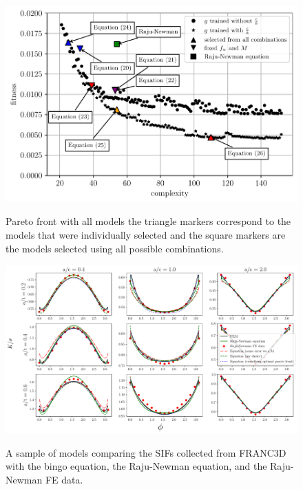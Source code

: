 \begin{figure}
    \centering
    \includegraphics[width=\textwidth]{Figures_pdf/Pareto_fronts_everything.pdf}
    \label{fig:perato_front_everythin}
    \caption{Pareto front with all models the triangle markers correspond to the models that were individually selected and the square markers are the models selected using all possible combinations.}
\end{figure}

\begin{figure}
    \centering
    \includegraphics[width=\textwidth]{Figures_pdf/K_data_with_bingo.pdf}
    \label{fig:K_data_with_bingo}
    \caption{A sample of models comparing the SIFs collected from FRANC3D with the bingo equation, the Raju-Newman equation, and the Raju-Newman FE data.}
\end{figure}